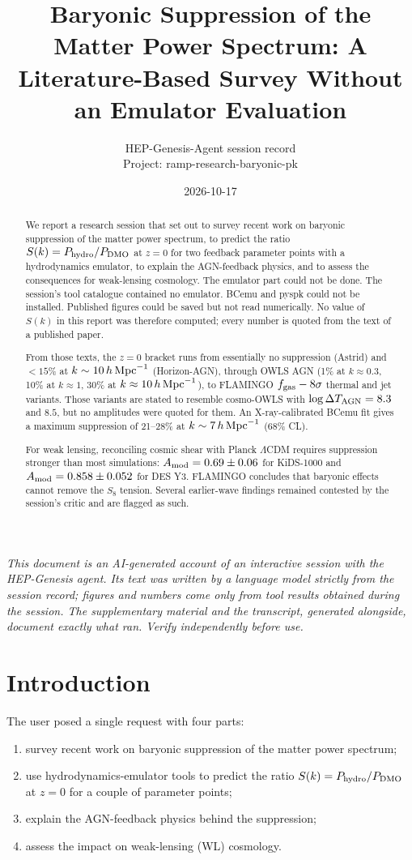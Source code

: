 \documentclass[11pt,a4paper]{article}
\title{Baryonic Suppression of the Matter Power Spectrum: A Literature-Based Survey Without an Emulator Evaluation}
\author{HEP-Genesis-Agent session record \\ \small Project: ramp-research-baryonic-pk}
\date{2026-10-17}
\begin{document}
\maketitle
\noindent\textit{\small This document is an AI-generated account of an interactive session with the HEP-Genesis agent. Its text was written by a language model strictly from the session record; figures and numbers come only from tool results obtained during the session. The supplementary material and the transcript, generated alongside, document exactly what ran. Verify independently before use.}
\vspace{1em}

\begin{abstract}
We report a research session that set out to survey recent work on baryonic suppression of the matter power spectrum, to predict the ratio $S(k)=P_{\rm hydro}/P_{\rm DMO}$ at $z=0$ for two feedback parameter points with a hydrodynamics emulator, to explain the AGN-feedback physics, and to assess the consequences for weak-lensing cosmology. The emulator part could not be done. The session's tool catalogue contained no emulator. BCemu and pyspk could not be installed. Published figures could be saved but not read numerically. No value of $S(k)$ in this report was therefore computed; every number is quoted from the text of a published paper.

From those texts, the $z=0$ bracket runs from essentially no suppression (Astrid) and $<15\%$ at $k\sim10\,h\,{\rm Mpc}^{-1}$ (Horizon-AGN), through OWLS AGN (1\% at $k\approx0.3$, 10\% at $k\approx1$, 30\% at $k\approx10\,h\,{\rm Mpc}^{-1}$), to FLAMINGO $f_{\rm gas}-8\sigma$ thermal and jet variants. Those variants are stated to resemble cosmo-OWLS with $\log\Delta T_{\rm AGN}=8.3$ and $8.5$, but no amplitudes were quoted for them. An X-ray-calibrated BCemu fit gives a maximum suppression of 21--28\% at $k\sim7\,h\,{\rm Mpc}^{-1}$ (68\% CL).

For weak lensing, reconciling cosmic shear with Planck $\Lambda$CDM requires suppression stronger than most simulations: $A_{\rm mod}=0.69\pm0.06$ for KiDS-1000 and $A_{\rm mod}=0.858\pm0.052$ for DES Y3. FLAMINGO concludes that baryonic effects cannot remove the $S_8$ tension. Several earlier-wave findings remained contested by the session's critic and are flagged as such.
\end{abstract}

\section{Introduction}
The user posed a single request with four parts:
\begin{enumerate}
\item survey recent work on baryonic suppression of the matter power spectrum;
\item use hydrodynamics-emulator tools to predict the ratio $S(k)=P_{\rm hydro}/P_{\rm DMO}$ at $z=0$ for a couple of parameter points;
\item explain the AGN-feedback physics behind the suppression;
\item assess the impact on weak-lensing (WL) cosmology.
\end{enumerate}
\end{document}
